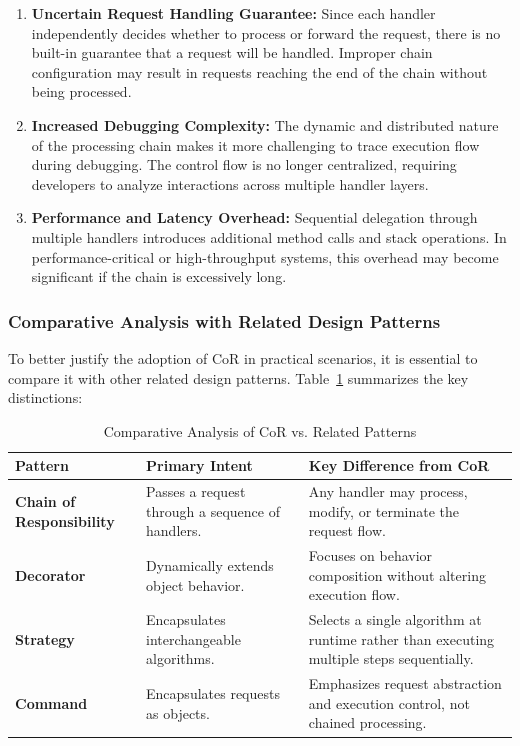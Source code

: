 \begin{enumerate}
    \item \textbf{Uncertain Request Handling Guarantee:} Since each handler independently decides whether to process or forward the request, there is no built-in guarantee that a request will be handled. Improper chain configuration may result in requests reaching the end of the chain without being processed.
    
    \item \textbf{Increased Debugging Complexity:} The dynamic and distributed nature of the processing chain makes it more challenging to trace execution flow during debugging. The control flow is no longer centralized, requiring developers to analyze interactions across multiple handler layers.
    
    \item \textbf{Performance and Latency Overhead:} Sequential delegation through multiple handlers introduces additional method calls and stack operations. In performance-critical or high-throughput systems, this overhead may become significant if the chain is excessively long.
\end{enumerate}

\subsubsection{Comparative Analysis with Related Design Patterns}
To better justify the adoption of CoR in practical scenarios, it is essential to compare it with other related design patterns. Table~\ref{tab:pattern_comparison} summarizes the key distinctions:

\begin{table}[H]
    \centering
    \caption{Comparative Analysis of CoR vs. Related Patterns}
    \label{tab:pattern_comparison}
    \small
    \begin{tabularx}{\linewidth}{l X X}
        \hline
        \textbf{Pattern} & \textbf{Primary Intent} & \textbf{Key Difference from CoR} \\
        \hline
        \textbf{Chain of Responsibility} & Passes a request through a sequence of handlers. & Any handler may process, modify, or terminate the request flow. \\
        \textbf{Decorator} & Dynamically extends object behavior. & Focuses on behavior composition without altering execution flow. \\
        \textbf{Strategy} & Encapsulates interchangeable algorithms. & Selects a single algorithm at runtime rather than executing multiple steps sequentially. \\
        \textbf{Command} & Encapsulates requests as objects. & Emphasizes request abstraction and execution control, not chained processing. \\
        \hline
    \end{tabularx}
\end{table}

